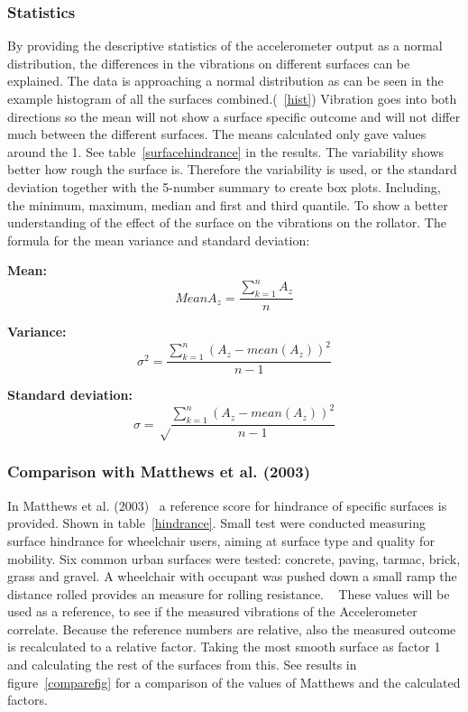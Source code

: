 \subsubsection{Statistics}
By providing the descriptive statistics of the accelerometer output as a normal distribution, the differences in the vibrations on different surfaces can be explained. The data is approaching a normal distribution as can be seen in the example histogram of all the surfaces combined.(~\ref{hist}) Vibration goes into both directions so the mean will not show a surface specific outcome and will not differ much between the different surfaces. The means calculated only gave values around the 1. See table~\ref{surfacehindrance} in the results. The variability shows better how rough the surface is. Therefore the variability is used, or the standard deviation together with the 5-number summary to create box plots. Including, the minimum, maximum, median and first and third quantile. To show a better understanding of the effect of the surface on the vibrations on the rollator. The formula for the mean variance and standard deviation:

\textbf{Mean:}  
\begin{equation}
Mean A_{z} = \frac{\sum_{k=1}^n A_{z}}{n}
\end{equation}

\textbf{Variance:}
\begin{equation}
\sigma^2 = \frac{\sum_{k=1}^n (A_{z}- mean(A_{z}))^2}{n-1}
\end{equation}

\textbf{Standard deviation:}
\begin{equation}
\sigma = \sqrt \frac{\sum_{k=1}^n (A_{z}- mean(A_{z}))^2}{n-1}
\end{equation}

\subsubsection{Comparison with Matthews et al. (2003)}
In Matthews et al. (2003)~\cite{Matthews2003} a reference score for hindrance of specific surfaces is provided. Shown in table~\ref{hindrance}.
Small test were conducted measuring surface hindrance for wheelchair users, aiming at surface type and quality for mobility. Six common urban surfaces were tested: concrete, paving, tarmac, brick, grass and gravel. A wheelchair with occupant was pushed down a small ramp the distance rolled provides an measure for rolling resistance. ~\cite{Matthews2003}
These values will be used as a reference, to see if the measured vibrations of the Accelerometer correlate. Because the reference numbers are relative, also the measured outcome is recalculated to a relative factor. Taking the most smooth surface as factor 1 and calculating the rest of the surfaces from this. See results in figure~\ref{comparefig} for a comparison of the values of Matthews and the calculated factors. 

